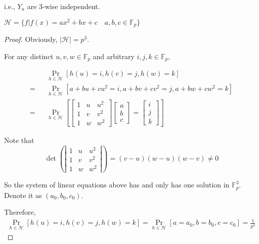 			i.e., $Y_u$ are $3$-wise independent.
		\item
		
			$\mathcal{H} = \{ f | f(x) = a x^2 + b x + c \quad a,b,c \in \mathbb{F}_{p} \}$
			
			\begin{proof}
			
				Obviously, $|\mathcal{H}| = p^3$.
				
				For any distinct $u, v, w \in \mathbb{F}_{p}$ and arbitrary $i, j, k \in \mathbb{F}_{p}$,
				
				\begin{eqnarray*}
					&&\mathop{\text{Pr}} \limits_{h \in \mathcal{H}} [h(u) = i, h(v) = j, h(w) = k] \\
					= &&\mathop{\text{Pr}} \limits_{h \in \mathcal{H}} [a + bu + cu^2 = i, a + bv + cv^2 = j, a + bw + cw^2 = k] \\
					= &&\mathop{\text{Pr}} \limits_{h \in \mathcal{H}}[
					\left[
					\begin{matrix}
						1 & u & u^2 \\
						1 & v & v^2 \\
						1 & w & w^2
					\end{matrix}
					\right]
					\left[
					\begin{matrix}
						a \\
						b \\
						c
					\end{matrix}
					\right]
					=
					\left[
					\begin{matrix}
						i \\
						j \\
						k
					\end{matrix}
					\right]
					]
				\end{eqnarray*}
				
				Note that
				\[
					\det
					\left(\left|
					\begin{matrix}
						1 & u & u^2 \\
						1 & v & v^2 \\
						1 & w & w^2
					\end{matrix}
					\right|\right)
					=
					(v - u)(w - u)(w - v)
					\neq
					0
				\]
				
				So the system of linear equations above has and only has one solution in $\mathbb{F}^{3}_{p}$.
				Denote it as $(a_0, b_0, c_0)$.
				
				Therefore,
				\begin{eqnarray*}
					\mathop{\text{Pr}} \limits_{h \in \mathcal{H}}[h(u) = i, h(v) = j, h(w) = k]
					= \mathop{\text{Pr}} \limits_{h \in \mathcal{H}}[a = a_0, b = b_0, c = c_0]
					= \frac{1}{p^3}
				\end{eqnarray*}
			\end{proof}
		
